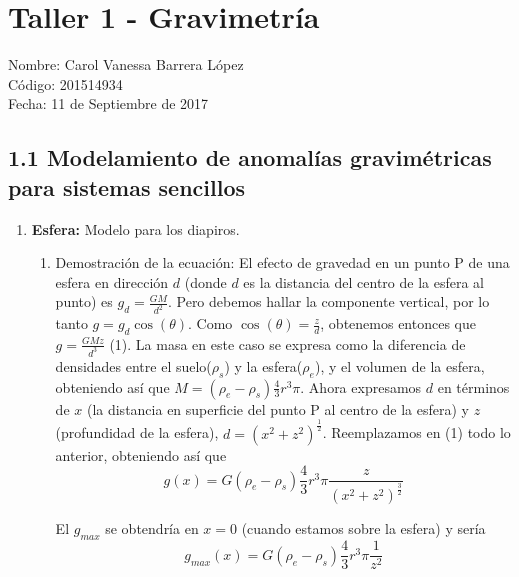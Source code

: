 \documentclass{article}
\begin{document}
\section*{Taller 1 - Gravimetr\'ia}
Nombre: Carol Vanessa Barrera L\'opez 
\\ C\'odigo: 201514934
\\Fecha: 11 de Septiembre de 2017

\subsection*{1.1 Modelamiento de anomal\'ias gravim\'etricas para sistemas sencillos} 

\begin{enumerate}%

\item {\bf Esfera:} Modelo para los diapiros.
	\begin{enumerate}
	\item Demostraci\'on de la ecuaci\'on:
	El efecto de gravedad en un punto P de una esfera en direcci\'on $d$ (donde $d$ es la distancia del centro de la esfera al punto) es  $g_d =\frac{GM}{d^{2}}$. Pero debemos hallar la componente vertical, por lo tanto $g = g_d\cos(\theta)$. Como $\cos(\theta)= \frac{z}{d}$, obtenemos entonces que $g =\frac{GMz}{d^{3}}$ (1). La masa en este caso se expresa como la diferencia de densidades entre el suelo($\rho_s$) y la esfera($\rho_e$), y el volumen de la esfera, obteniendo as\'i que $M = (\rho_e-\rho_s)\frac{4}{3}r^{3}\pi $. Ahora expresamos $d$ en t\'erminos de $x$ (la distancia en superficie del punto P al centro de la esfera) y $z$ (profundidad de la esfera), $d = (x^{2}+z^{2})^{\frac{1}{2}}$. Reemplazamos en (1) todo lo anterior, obteniendo as\'i que
\begin{equation*}
g(x) = G(\rho_e-\rho_s)\frac{4}{3}r^{3}\pi \frac{z}{(x^{2}+z^{2})^{\frac{3}{2}}}
\end{equation*}

El $g_{max}$ se obtendr\'ia en $x=0$ (cuando estamos sobre la esfera) y ser\'ia 
\begin{equation*}
g_{max}(x) = G(\rho_e-\rho_s)\frac{4}{3}r^{3}\pi \frac{1}{z^{2}}
\end{equation*}


\end{enumerate}
\end{enumerate}
\end{document}
